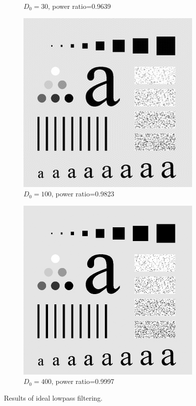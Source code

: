 \begin{figure}[h!]
\begin{subfigure}[b]{0.45\linewidth}
		\caption{$D_0=30$, power ratio=0.9639}
		\label{fig:ILPF_30}
	\end{subfigure}
  	\begin{subfigure}[b]{0.45\linewidth}
		\includegraphics[width=\linewidth]{myfigure/p3/ILPF_100.png}
		\caption{$D_0=100$, power ratio=0.9823}
		\label{fig:ILPF_100}
	\end{subfigure}
	\begin{subfigure}[b]{0.45\linewidth}
		\includegraphics[width=\linewidth]{myfigure/p3/ILPF_400.png}
		\caption{$D_0=400$, power ratio=0.9997}
		\label{fig:ILPF_400}
	\end{subfigure}
  	\caption{Results of ideal lowpass filtering.}
  	\label{fig:ILPF}
\end{figure}

